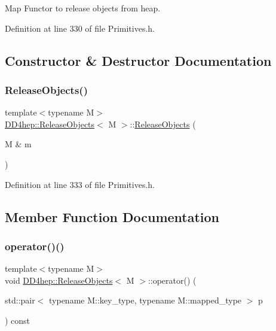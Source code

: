 Map Functor to release objects from heap. 

Definition at line 330 of file Primitives.\+h.



\subsection{Constructor \& Destructor Documentation}
\hypertarget{class_d_d4hep_1_1_release_objects_ac8bed15483a32f35c3a157ff1a906080}{}\label{class_d_d4hep_1_1_release_objects_ac8bed15483a32f35c3a157ff1a906080} 
\subsubsection{\texorpdfstring{Release\+Objects()}{ReleaseObjects()}}
{\footnotesize\ttfamily template$<$typename M$>$ \\
\hyperlink{class_d_d4hep_1_1_release_objects}{D\+D4hep\+::\+Release\+Objects}$<$ M $>$\+::\hyperlink{class_d_d4hep_1_1_release_objects}{Release\+Objects} (\begin{DoxyParamCaption}\item[{M \&}]{m }\end{DoxyParamCaption})\hspace{0.3cm}{\ttfamily [inline]}}



Definition at line 333 of file Primitives.\+h.



\subsection{Member Function Documentation}
\hypertarget{class_d_d4hep_1_1_release_objects_a76c10066e6dfdb228c341c6784a3bc0b}{}\label{class_d_d4hep_1_1_release_objects_a76c10066e6dfdb228c341c6784a3bc0b} 
\subsubsection{\texorpdfstring{operator()()}{operator()()}\hspace{0.1cm}{\footnotesize\ttfamily [1/2]}}
{\footnotesize\ttfamily template$<$typename M$>$ \\
void \hyperlink{class_d_d4hep_1_1_release_objects}{D\+D4hep\+::\+Release\+Objects}$<$ M $>$\+::operator() (\begin{DoxyParamCaption}\item[{std\+::pair$<$ typename M\+::key\+\_\+type, typename M\+::mapped\+\_\+type $>$}]{p }\end{DoxyParamCaption}) const\hspace{0.3cm}{\ttfamily [inline]}}



